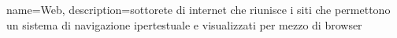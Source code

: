 {
	name={Web},
	description={sottorete di internet che riunisce i siti che permettono un sistema di navigazione ipertestuale e visualizzati per mezzo di browser}
}
